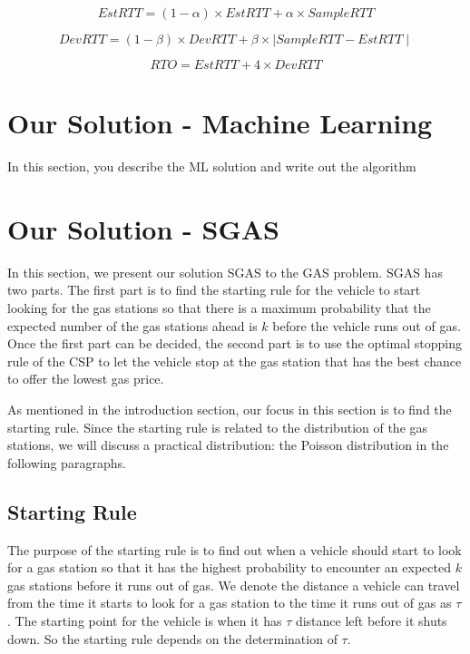 \documentclass[conference]{IEEEtran}
\theoremstyle{definition}
\begin{document}
\begin{equation}
EstRTT = (1-\alpha)\times EstRTT + \alpha \times SampleRTT
\end{equation}

\begin{equation}
DevRTT = (1-\beta)\times DevRTT + \beta \times \mid SampleRTT - EstRTT \mid
\end{equation}

\begin{equation}
RTO = EstRTT + 4\times DevRTT
\end{equation}

\section{Our Solution - Machine Learning}
{\color{red} In this section, you describe the ML solution and write out the algorithm}

\section{Our Solution - SGAS}
In this section, we present our solution SGAS to the GAS problem. SGAS has two parts. The first part is to find the starting rule for the vehicle to start looking for the gas stations so that there is a maximum probability that the expected number of the gas stations ahead is $k$ before the vehicle runs out of gas. Once the first part can be decided, the second part is to use the optimal stopping rule of the CSP to let the vehicle stop at the gas station that has the best chance to offer the lowest gas price.

As mentioned in the introduction section, our focus in this section is to find the starting rule. Since the starting rule is related to the distribution of the gas stations, we will discuss a practical distribution: the Poisson distribution in the following paragraphs.

\subsection{Starting Rule}
The purpose of the starting rule is to find out when a vehicle should start to look for a gas station so that it has the highest probability to encounter an expected $k$ gas stations before it runs out of gas. We denote the distance a vehicle can travel from the time it starts to look for a gas station to the time it runs out of gas as $\tau$. The starting point for the vehicle is when it has $\tau$ distance left before it shuts down. So the starting rule depends on the determination of $\tau$.
\end{document}
